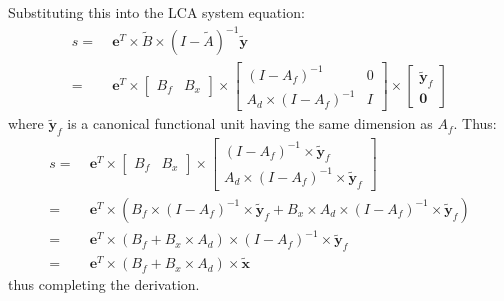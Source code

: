 Substituting this into the LCA system equation:
\begin{align}
  s =\;& \mathbf{e}^T\times \tilde{B}\times(I-\tilde{A})^{-1}\tilde{\mathbf{y}}\\
  =\;& \mathbf{e}^T\times \left[\begin{array}{cc} B_f & B_x \end{array}\right]\times
  \left[\begin{array}{cc} (I-A_f)^{-1} & 0 \\ A_d\times(I-A_f)^{-1} & I \end{array}\right]
  \times\left[\begin{array}{c} \tilde{\mathbf{y}}_f \\ \mathbf{0}\end{array}\right]
\end{align}
where $\tilde{\mathbf{y}}_f$ is a canonical functional unit having the same dimension as $A_f$.  Thus:
\begin{align}
s =\;& \mathbf{e}^T\times \left[\begin{array}{cc} B_f & B_x \end{array}\right]\times
 \left[\begin{array}{c} (I-A_f)^{-1}\times\tilde{\mathbf{y}}_f \\ A_d\times(I-A_f)^{-1}\times\tilde{\mathbf{y}}_f\end{array}\right]\\
 =\;& \mathbf{e}^T\times \left(B_f\times(I-A_f)^{-1}\times\tilde{\mathbf{y}}_f
 + B_x\times A_d\times(I-A_f)^{-1}\times\tilde{\mathbf{y}}_f\right)\\
 =\;& \mathbf{e}^T\times \left(B_f + B_x\times A_d\right)\times(I-A_f)^{-1}\times \tilde{\mathbf{y}}_f\\
 =\;& \mathbf{e}^T\times \left(B_f + B_x\times A_d\right)\times \tilde{\mathbf{x}}
\end{align}
thus completing the derivation.

